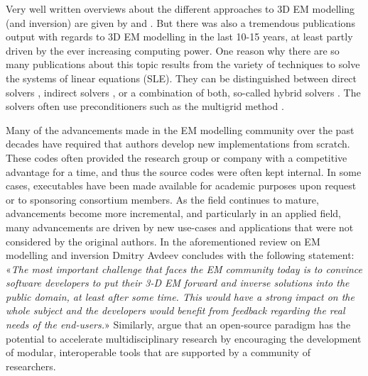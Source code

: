 \documentclass[
    paper,
  ]{geophysics}
\begin{document}
Very well written overviews about the different approaches to 3D EM modelling (and inversion) are given by \cite{SG.05.Avdeev} and \cite{SG.10.Borner}. But there was also a tremendous publications output with regards to 3D EM modelling in the last 10-15 years, at least partly driven by the ever increasing computing power. One reason why there are so many publications about this topic results from the variety of techniques to solve the systems of linear equations (SLE). They can be distinguished between direct solvers \citep{GEO.09.Streich, GP.14.Chung, GEO.14.Jaysaval, GEO.15.Grayver, SEG.15.Oh, GJI.18.Wang}, indirect solvers \citep{GP.06.Mulder, GJI.15.Jaysaval}, or a combination of both, so-called hybrid solvers \citep{GEO.18.Liu}. The solvers often use preconditioners such as the multigrid method \citep{SIAM.02.Aruliah, GJI.16.Jaysaval}.

Many of the advancements made in the EM modelling community over the past decades have required that authors develop new implementations from scratch. These codes often provided the research group or company with a competitive advantage for a time, and thus the source codes were often kept internal. In some cases, executables have been made available for academic purposes upon request or to sponsoring consortium members. As the field continues to mature, advancements become more incremental, and particularly in an applied field, many advancements are driven by new use-cases and applications that were not considered by the original authors. In the aforementioned review on EM modelling and inversion Dmitry Avdeev concludes with the following statement: «\emph{The most important challenge that faces the EM community today is to convince software developers to put their 3-D EM forward and inverse solutions into the public domain, at least after some time. This would have a strong impact on the whole subject and the developers would benefit from feedback regarding the real needs of the end-users.}» Similarly, \cite{EXG.19.Oldenburg} argue that an open-source paradigm has the potential to accelerate multidisciplinary research by encouraging the development of modular, interoperable tools that are supported by a community of researchers.
\end{document}
